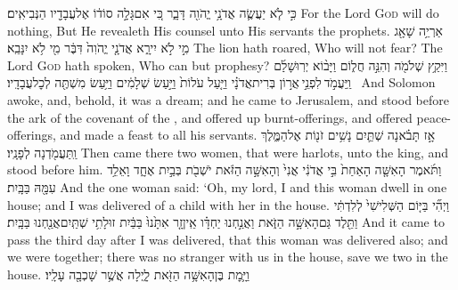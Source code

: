 {כִּ֣י לֹ֧א יַעֲשֶׂ֛ה אֲדֹנָ֥י יֱהֹוִ֖ה דָּבָ֑ר כִּ֚י אִם\maqqaf גָּלָ֣ה סוֹד֔וֹ אֶל\maqqaf עֲבָדָ֖יו הַנְּבִיאִֽים׃}
{For the Lord \textsc{God} will do nothing, But He revealeth His counsel unto His servants the prophets.}
{אַרְיֵ֥ה שָׁאָ֖ג מִ֣י לֹ֣א יִירָ֑א אֲדֹנָ֤י יֱהֹוִה֙ דִּבֶּ֔ר מִ֖י לֹ֥א יִנָּבֵֽא׃}
{The lion hath roared, Who will not fear? The Lord \textsc{God} hath spoken, Who can but prophesy?}
\newperek
{}
\label{haft_10}
\setcounter{chap}{3}
\setcounter{verse}{15}
{וַיִּקַ֥ץ שְׁלֹמֹ֖ה וְהִנֵּ֣ה חֲל֑וֹם וַיָּב֨וֹא יְרֽוּשָׁלַ֜͏ִם וַֽיַּעֲמֹ֣ד \legarmeh  לִפְנֵ֣י \legarmeh  אֲר֣וֹן בְּרִית\maqqaf אֲדֹנָ֗י וַיַּ֤עַל עֹלוֹת֙ וַיַּ֣עַשׂ שְׁלָמִ֔ים וַיַּ֥עַשׂ מִשְׁתֶּ֖ה לְכׇל\maqqaf עֲבָדָֽיו׃ \petucha }
{And Solomon awoke, and, behold, it was a dream; and he came to Jerusalem, and stood before the ark of the covenant of the \lord, and offered up burnt-offerings, and offered peace-offerings, and made a feast to all his servants.}
{אָ֣ז תָּבֹ֗אנָה שְׁתַּ֛יִם נָשִׁ֥ים זֹנ֖וֹת אֶל\maqqaf הַמֶּ֑לֶךְ וַֽתַּעֲמֹ֖דְנָה לְפָנָֽיו׃}
{Then came there two women, that were harlots, unto the king, and stood before him.}
{וַתֹּ֜אמֶר הָאִשָּׁ֤ה הָאַחַת֙ בִּ֣י אֲדֹנִ֔י אֲנִי֙ וְהָאִשָּׁ֣ה הַזֹּ֔את יֹשְׁבֹ֖ת בְּבַ֣יִת אֶחָ֑ד וָאֵלֵ֥ד עִמָּ֖הּ בַּבָּֽיִת׃}
{And the one woman said: ‘Oh, my lord, I and this woman dwell in one house; and I was delivered of a child with her in the house.}
{וַיְהִ֞י בַּיּ֤וֹם הַשְּׁלִישִׁי֙ לְלִדְתִּ֔י וַתֵּ֖לֶד גַּם\maqqaf הָאִשָּׁ֣ה הַזֹּ֑את וַאֲנַ֣חְנוּ יַחְדָּ֗ו אֵֽין\maqqaf זָ֤ר אִתָּ֙נוּ֙ בַּבַּ֔יִת זוּלָתִ֥י שְׁתַּֽיִם\maqqaf אֲנַ֖חְנוּ בַּבָּֽיִת׃}
{And it came to pass the third day after I was delivered, that this woman was delivered also; and we were together; there was no stranger with us in the house, save we two in the house.}
{וַיָּ֛מׇת בֶּן\maqqaf הָאִשָּׁ֥ה הַזֹּ֖את לָ֑יְלָה אֲשֶׁ֥ר שָׁכְבָ֖ה עָלָֽיו׃}
